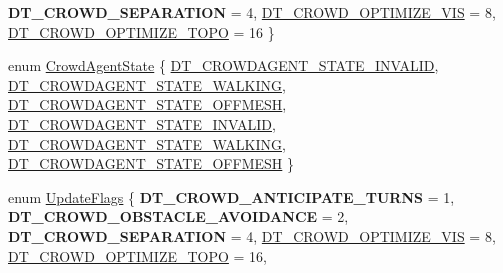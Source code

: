 \begin{DoxyCompactItemize}
{\bfseries D\+T\+\_\+\+C\+R\+O\+W\+D\+\_\+\+S\+E\+P\+A\+R\+A\+T\+I\+ON} = 4, 
\newline
\hyperlink{group__crowd_ggaa94b67d2fdcc390690c523f28019e52fad11f447facf1bf42c09de64e9483f3aa}{D\+T\+\_\+\+C\+R\+O\+W\+D\+\_\+\+O\+P\+T\+I\+M\+I\+Z\+E\+\_\+\+V\+IS} = 8, 
\hyperlink{group__crowd_ggaa94b67d2fdcc390690c523f28019e52fa89c6f7f2e49254e775cb2b85259a0a93}{D\+T\+\_\+\+C\+R\+O\+W\+D\+\_\+\+O\+P\+T\+I\+M\+I\+Z\+E\+\_\+\+T\+O\+PO} = 16
 \}
\item 
enum \hyperlink{group__crowd_ga59bc9aa54705292d8f0f1ad9ca48ca82}{Crowd\+Agent\+State} \{ \newline
\hyperlink{group__crowd_gga59bc9aa54705292d8f0f1ad9ca48ca82ac2abcf7abcdba5abeda5801fc771baa8}{D\+T\+\_\+\+C\+R\+O\+W\+D\+A\+G\+E\+N\+T\+\_\+\+S\+T\+A\+T\+E\+\_\+\+I\+N\+V\+A\+L\+ID}, 
\hyperlink{group__crowd_gga59bc9aa54705292d8f0f1ad9ca48ca82ab165ebb808ee9390c7f7ec9f5ea277ec}{D\+T\+\_\+\+C\+R\+O\+W\+D\+A\+G\+E\+N\+T\+\_\+\+S\+T\+A\+T\+E\+\_\+\+W\+A\+L\+K\+I\+NG}, 
\hyperlink{group__crowd_gga59bc9aa54705292d8f0f1ad9ca48ca82a4194d4934f447526177f505e93c96fec}{D\+T\+\_\+\+C\+R\+O\+W\+D\+A\+G\+E\+N\+T\+\_\+\+S\+T\+A\+T\+E\+\_\+\+O\+F\+F\+M\+E\+SH}, 
\hyperlink{group__crowd_gga59bc9aa54705292d8f0f1ad9ca48ca82ac2abcf7abcdba5abeda5801fc771baa8}{D\+T\+\_\+\+C\+R\+O\+W\+D\+A\+G\+E\+N\+T\+\_\+\+S\+T\+A\+T\+E\+\_\+\+I\+N\+V\+A\+L\+ID}, 
\newline
\hyperlink{group__crowd_gga59bc9aa54705292d8f0f1ad9ca48ca82ab165ebb808ee9390c7f7ec9f5ea277ec}{D\+T\+\_\+\+C\+R\+O\+W\+D\+A\+G\+E\+N\+T\+\_\+\+S\+T\+A\+T\+E\+\_\+\+W\+A\+L\+K\+I\+NG}, 
\hyperlink{group__crowd_gga59bc9aa54705292d8f0f1ad9ca48ca82a4194d4934f447526177f505e93c96fec}{D\+T\+\_\+\+C\+R\+O\+W\+D\+A\+G\+E\+N\+T\+\_\+\+S\+T\+A\+T\+E\+\_\+\+O\+F\+F\+M\+E\+SH}
 \}
\item 
enum \hyperlink{group__crowd_gaa94b67d2fdcc390690c523f28019e52f}{Update\+Flags} \{ \newline
{\bfseries D\+T\+\_\+\+C\+R\+O\+W\+D\+\_\+\+A\+N\+T\+I\+C\+I\+P\+A\+T\+E\+\_\+\+T\+U\+R\+NS} = 1, 
{\bfseries D\+T\+\_\+\+C\+R\+O\+W\+D\+\_\+\+O\+B\+S\+T\+A\+C\+L\+E\+\_\+\+A\+V\+O\+I\+D\+A\+N\+CE} = 2, 
{\bfseries D\+T\+\_\+\+C\+R\+O\+W\+D\+\_\+\+S\+E\+P\+A\+R\+A\+T\+I\+ON} = 4, 
\hyperlink{group__crowd_ggaa94b67d2fdcc390690c523f28019e52fad11f447facf1bf42c09de64e9483f3aa}{D\+T\+\_\+\+C\+R\+O\+W\+D\+\_\+\+O\+P\+T\+I\+M\+I\+Z\+E\+\_\+\+V\+IS} = 8, 
\newline
\hyperlink{group__crowd_ggaa94b67d2fdcc390690c523f28019e52fa89c6f7f2e49254e775cb2b85259a0a93}{D\+T\+\_\+\+C\+R\+O\+W\+D\+\_\+\+O\+P\+T\+I\+M\+I\+Z\+E\+\_\+\+T\+O\+PO} = 16, 

\end{DoxyCompactItemize}
